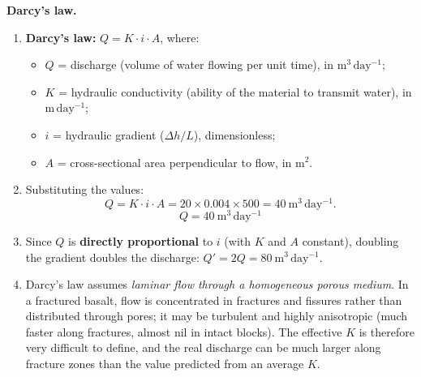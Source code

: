 \documentclass[11pt]{article}
\begin{document}
\begin{corrige}[Exercise 6]
\textbf{Darcy's law.}
\begin{enumerate}
\item \textbf{Darcy's law:} $Q = K \cdot i \cdot A$, where:
\begin{itemize}
\item $Q$ = discharge (volume of water flowing per unit time), in $\mathrm{m^3\,day^{-1}}$;
\item $K$ = hydraulic conductivity (ability of the material to transmit water), in $\mathrm{m\,day^{-1}}$;
\item $i$ = hydraulic gradient ($\Delta h / L$), dimensionless;
\item $A$ = cross-sectional area perpendicular to flow, in $\mathrm{m^2}$.
\end{itemize}
\item Substituting the values:
\[ Q = K \cdot i \cdot A = 20 \times 0.004 \times 500 = 40\ \mathrm{m^3\,day^{-1}}. \]
\[ \boxed{Q = 40\ \mathrm{m^3\,day^{-1}}} \]
\item Since $Q$ is \textbf{directly proportional} to $i$ (with $K$ and $A$ constant), doubling the gradient doubles the discharge: $Q' = 2Q = 80\ \mathrm{m^3\,day^{-1}}$.
\item Darcy's law assumes \emph{laminar flow through a homogeneous porous medium}. In a fractured basalt, flow is concentrated in fractures and fissures rather than distributed through pores; it may be turbulent and highly anisotropic (much faster along fractures, almost nil in intact blocks). The effective $K$ is therefore very difficult to define, and the real discharge can be much larger along fracture zones than the value predicted from an average $K$.
\end{enumerate}
\end{corrige}
\end{document}
